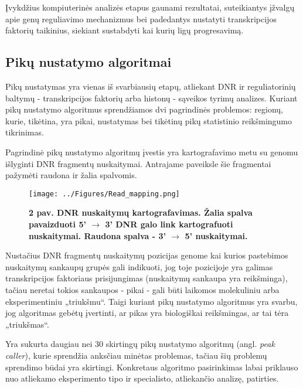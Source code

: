 \documentclass[12pt]{article}
\begin{document}
Įvykdžius kompiuterinės analizės etapus gaunami rezultatai, suteikiantys
įžvalgų apie genų reguliavimo mechanizmus bei padedantys nustatyti
transkripcijos faktorių taikinius, siekiant sustabdyti kai kurių ligų
progresavimą.

\newpage

\subsection{Pikų nustatymo algoritmai}
Pikų nustatymas yra vienas iš svarbiausių etapų, atliekant DNR ir reguliatorinių
baltymų - transkripcijos faktorių arba histonų - sąveikos tyrimų analizes.
Kuriant pikų nustatymo algoritmus sprendžiamos dvi pagrindinės problemos:
regionų, kurie, tikėtina, yra pikai, nustatymas bei tikėtinų pikų statistinio
reikšmingumo tikrinimas.

Pagrindinė pikų nustatymo algoritmų įvestis yra kartografavimo metu su genomu
išlyginti DNR fragmentų nuskaitymai. Antrajame paveiksle šie fragmentai pažymėti
raudona ir žalia spalvomis.

\begin{figure}[ht]
    \begin{center}
        \captionsetup{justification=centering}
        \texttt{[image: ../Figures/Read\_mapping.png]}
        \vspace{-1\baselineskip}
        \caption*{\small\textbf{2 pav. DNR nuskaitymų kartografavimas. Žalia
                                spalva pavaizduoti 5' \(\rightarrow\) 3' DNR
                                galo link kartografuoti nuskaitymai. Raudona
                                spalva - 3' \(\rightarrow\) 5' nuskaitymai.}}
    \end{center}
\end{figure}

Nustačius DNR fragmentų nuskaitymų pozicijas genome kai kurios pastebimos
nuskaitymų sankaupų grupės gali indikuoti, jog toje pozicijoje yra galimas
transkripcijos faktoriaus prisijungimas (nuskaitymų sankaupa yra reikšminga),
tačiau neretai tokios sankaupos - pikai - gali būti laikomos molekuliniu arba
eksperimentiniu „triukšmu“. Taigi kuriant pikų nustatymo algoritmus yra
svarbu, jog algoritmas gebėtų įvertinti, ar pikas yra biologiškai reikšmingas,
ar tai tėra „triukšmas“.

Yra sukurta daugiau nei 30 skirtingų pikų nustatymo algoritmų (angl.
\emph{peak caller}), kurie sprendžia anksčiau minėtas problemas,
tačiau šių problemų sprendimo būdai yra skirtingi. Konkretaus algoritmo
pasirinkimas labai priklauso nuo atliekamo eksperimento tipo ir specialisto,
atliekančio analizę, patirties\cite{ARTICLE13}.
\end{document}
